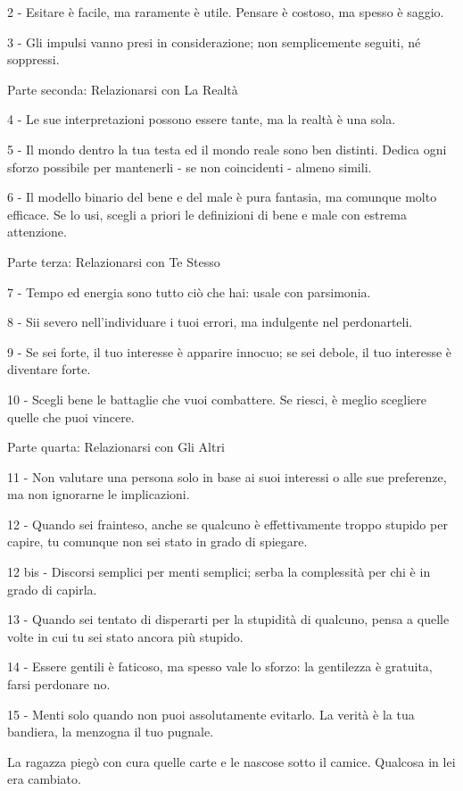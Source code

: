 2 - Esitare è facile, ma raramente è utile. Pensare è costoso, ma spesso è saggio.

3 - Gli impulsi vanno presi in considerazione; non semplicemente seguiti, né soppressi.

Parte seconda: Relazionarsi con La Realtà

4 - Le sue interpretazioni possono essere tante, ma la realtà è una sola.

5 - Il mondo dentro la tua testa ed il mondo reale sono ben distinti. Dedica ogni sforzo possibile per mantenerli - se non coincidenti - almeno simili.

6 - Il modello binario del bene e del male è pura fantasia, ma comunque molto efficace. Se lo usi, scegli a priori le definizioni di bene e male con estrema attenzione.

Parte terza: Relazionarsi con Te Stesso

7 - Tempo ed energia sono tutto ciò che hai: usale con parsimonia.

8 - Sii severo nell’individuare i tuoi errori, ma indulgente nel perdonarteli.

9 - Se sei forte, il tuo interesse è apparire innocuo; se sei debole, il tuo interesse è diventare forte.

10 - Scegli bene le battaglie che vuoi combattere. Se riesci, è meglio scegliere quelle che puoi vincere.

Parte quarta: Relazionarsi con Gli Altri

11 - Non valutare una persona solo in base ai suoi interessi o alle sue preferenze, ma non ignorarne le implicazioni.

12 - Quando sei frainteso, anche se qualcuno è effettivamente troppo stupido per capire, tu comunque non sei stato in grado di spiegare.

12 bis - Discorsi semplici per menti semplici; serba la complessità per chi è in grado di capirla.

13 - Quando sei tentato di disperarti per la stupidità di qualcuno, pensa a quelle volte in cui tu sei stato ancora più stupido.

14 - Essere gentili è faticoso, ma spesso vale lo sforzo: la gentilezza è gratuita, farsi perdonare no.

15 - Menti solo quando non puoi assolutamente evitarlo. La verità è la tua bandiera, la menzogna il tuo pugnale.

La ragazza piegò con cura quelle carte e le nascose sotto il camice. Qualcosa in lei era cambiato.
